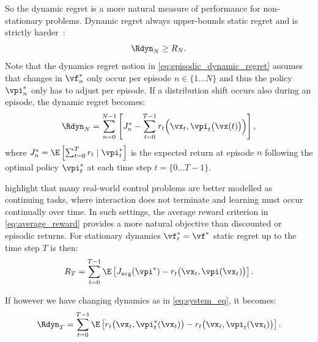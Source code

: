 So the dynamic regret is a more natural measure of performance for non-stationary problems.
Dynamic regret always upper-bounds static regret and is strictly harder~\citep{fei_dynamic_2020}:
\begin{equation}
    \Rdyn_N \geq R_N.
\end{equation}
Note that the dynamics regret notion in \cref{eq:episodic_dynamic_regret} assumes that changes in $\vf_n^*$ only occur per episode $n\in\{1\ldots N\}$ and thus the policy $\vpi^*_n$ only has to adjust per episode. If a distribution shift occurs also during an episode, the dynamic regret becomes:
\begin{equation}
    \Rdyn_N = \sum_{n=0}^{N-1} \left[ J_n^* - \sum_{t=0}^{T-1}r_t\Big(\vx_t,\vpi_t\big(\vx(t)\big)\Big) \right],
    \label{eq:episodic_doubledynamic_regret}
\end{equation}
where $J_n^*=\E \left[ \sum_{t=0}^Tr_t \mid \vpi^*_t\right]$ is the expected return at episode $n$ following the optimal policy $\vpi^*_t$ at each time step $t=\{0\ldots T-1\}$.

 highlight that many real-world control problems are better modelled as continuing tasks, where interaction does not terminate and learning must occur continually over time. In such settings, the average reward criterion in \cref{eq:average_reward} provides a more natural objective than discounted or episodic returns. For stationary dynamics $\vf^*_t=\vf^*$ static regret up to the time step $T$ is then:
\begin{equation}
    R_T = \sum^{T-1}_{t=0} \E\left[
    J_{\text{avg}}(\vpi^*) - r_t\bigl(\vx_t, \vpi(\vx_t)\bigr)
    \right].
    \label{eq:static_average_regret}
\end{equation}

If however we have changing dynamics as in \cref{eq:system_eq}, it becomes:\\
\begin{equation}
    \Rdyn_T = \sum^{T-1}_{t=0} \E\left[
    r_t\bigl(\vx_t, \vpi^*_t(\vx_t)\bigr) - r_t\bigl(\vx_t, \vpi_t(\vx_t)\bigr)
    \right].
    \label{eq:dynamic_average_regret}
\end{equation}

